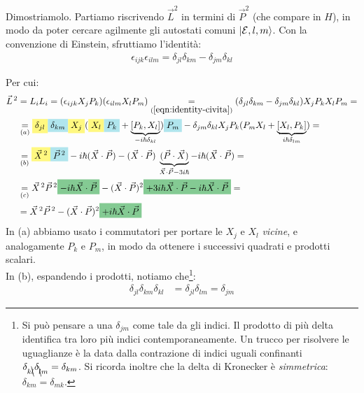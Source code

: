 \documentclass[../../FisicaTeorica.tex]{subfiles}
\begin{document}
Dimostriamolo. Partiamo riscrivendo $\vec{L}^2$ in termini di $\vec{P}^2$ (che compare in $H$), in modo da poter cercare agilmente gli autostati comuni $\Ket{\mathcal{E}, l, m}$.
Con la convenzione di Einstein, sfruttiamo l'identità:
\begin{align}
\epsilon_{ijk}\epsilon_{ilm}=\delta_{jl}\delta_{km}-\delta_{jm}\delta_{kl}
\label{eqn:identity-civita}
\end{align}

Per cui:
\begin{align}\nonumber
\vec{L}^{\,2} &= L_i L_i =(\epsilon_{ijk}X_j P_k)(\epsilon_{ilm} X_l P_m) \underset{(\ref{eqn:identity-civita})}{=} (\delta_{jl}\delta_{km}-\delta_{jm}\delta_{kl})X_j P_k X_l P_m =\\\nonumber
&\underset{(a)}{=} \hlc{Yellow}{\delta_{jl}}\hlc{SkyBlue}{\delta_{km}}\hlc{Yellow}{X_j}(\hlc{Yellow}{X_l }\hlc{SkyBlue}{P_k} + \underbrace{[P_k, X_l]}_{-i\hbar\delta_{kl}})\hlc{SkyBlue}{P_m} - \delta_{jm}\delta_{kl} X_j P_k (P_m X_l + \underbrace{[X_l, P_k]}_{i\hbar \delta_{lm}}) =\\\nonumber
&\underset{(b)}{=} \hlc{Yellow}{\vec{X}^{\,2}}\hlc{SkyBlue}{\vec{P}^{\,2}} - i\hbar (\vec{X}\cdot \vec{P}) - (\vec{X}\cdot\vec{P})\> \underbrace{(\vec{P}\cdot \vec{X})}_{\vec{X}\cdot \vec{P}-3i\hbar} -i\hbar (\vec{X}\cdot\vec{P})=\\\nonumber
&\underset{(c)}{=}\vec{X}^{\,2}\vec{P}^{\,2} \hlc{ForestGreen}{- i\hbar \vec{X}\cdot\vec{P} }- (\vec{X}\cdot \vec{P})^2\hlc{ForestGreen}{+3i\hbar \vec{X}\cdot\vec{P}-i\hbar \vec{X}\cdot\vec{P}}=\\ \label{eqn:Lquadro_Pquadro}
&=\vec{X}^{\,2}\vec{P}^{\,2}-(\vec{X}\cdot\vec{P})^2 \hlc{ForestGreen}{+ i\hbar \vec{X}\cdot\vec{P}}
\end{align}
In (a) abbiamo usato i commutatori per portare le $X_j$ e $X_l$ \textit{vicine}, e analogamente $P_k$ e $P_m$, in modo da ottenere i successivi quadrati e prodotti scalari.\\
In (b), espandendo i prodotti, notiamo che\footnote{Si può pensare a una $\delta_{jm}$ come tale da  gli indici. Il prodotto di più delta identifica tra loro più indici contemporaneamente. Un trucco per risolvere le uguaglianze è la  data dalla contrazione di indici uguali confinanti $\delta_{k\bcancel{l}}\delta_{\bcancel{l}m}=\delta_{km}$. Si ricorda inoltre che la delta di Kronecker è \textit{simmetrica}: $\delta_{km}=\delta_{mk}$.}:
\begin{align*}
\delta_{jl}\delta_{km}\delta_{kl}&=\delta_{jl}\delta_{lm}=\delta_{jm}
\end{align*}
\end{document}
